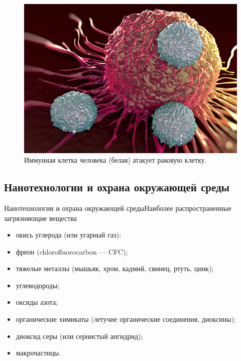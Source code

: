 \documentclass[_Venture_p3.tex]{subfiles}
\begin{document}
\begin{frame}
\begin{figure}
	\centering
	\includegraphics[scale=.45]{img/tcell_attacking_cancer_cell}
	\caption{Иммунная клетка человека (белая) атакует раковую клетку.}
\end{figure}
\end{frame}

\subsection{Нанотехнологии и охрана окружающей среды}
\begin{frame}{Нанотехнологии и охрана окружающей среды}{Наиболее распространенные загрязняющие вещества}
\begin{itemize}
	\item окись углерода (или угарный газ);
	\item фреон (chlorofluorocarbon — CFC);
	\item тяжелые металлы (мышьяк, хром, кадмий, свинец, ртуть, цинк);
	\item углеводороды;
	\item оксиды азота;
	\item органические химикаты (летучие органические соединения, диоксины);
	\item диоксид серы (или сернистый ангидрид);
	\item макрочастицы.
\end{itemize}
\end{frame}
\end{document}
